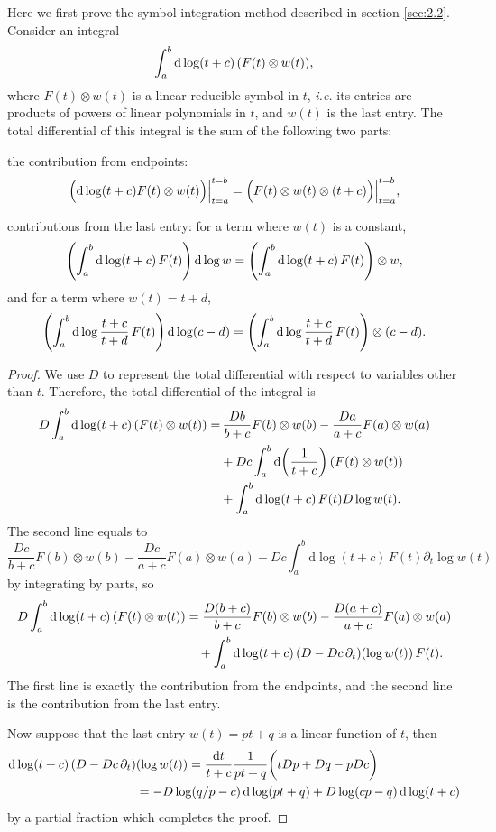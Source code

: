 \documentclass[a4paper,12pt]{article}
\newcommand{\dif}{\mathrm{d}} %
\begin{document}
Here we first prove the symbol integration method described in section \ref{sec:2.2}. Consider an integral
\[
\int_a^b {\rm d}\log(t+c)\, (F(t)\otimes w(t)),
\]
where $F(t)\otimes w(t)$ is a linear reducible symbol in $t$, {\it i.e.} its entries are products of powers of linear polynomials in $t$, and $w(t)$ is the last entry. The total differential of this integral is the sum of the following two parts:
\begin{compactenum}[\quad (1)]
\item the contribution from endpoints:
\[
   \Bigl( {\rm d}\log(t+c)F(t)\otimes w(t)\Bigr)\Bigr|_{t=a}^{t=b}=\Bigl(F(t)\otimes w(t)\otimes (t+c)\Bigr)\Bigr|_{t=a}^{t=b},
\]
\item contributions from the last entry: for a term where $w(t)$ is a constant,
\[
\left(\int_a^b {\rm d}\log(t+c)\, F(t)\right){\rm d}\log w=\left(\int_a^b {\rm d}\log(t+c)\, F(t)\right)\otimes w,
\]
and for a term where $w(t)=t+d$,
\[
\left(\int_a^b {\rm d}\log \frac{t+c}{t+d}\, F(t)\right){\rm d}\log (c-d)
=\left(\int_a^b {\rm d}\log \frac{t+c}{t+d}\, F(t)\right)\otimes (c-d).
\]
\end{compactenum}

\begin{proof}
We use $D$ to represent the total differential with respect to variables other than $t$. Therefore, the total differential of the integral is
\begin{align*}
D\int_a^b {\rm d}\log(t+c)\, (F(t)\otimes w(t))
=&\,\frac{Db}{b+c}F(b)\otimes w(b)-\frac{Da}{a+c}F(a)\otimes w(a)\\
&+Dc\int_a^b {\rm d}\biggl(\frac{1}{t+c}\biggr)\, (F(t)\otimes w(t))\\
&+\int_a^b {\rm d}\log(t+c)\, F(t) D\log w(t).
\end{align*}
The second line equals to 
\[
    \frac{Dc}{b+c}F(b)\otimes w(b)-\frac{Dc}{a+c}F(a)\otimes w(a)-Dc\int_a^b \dif\log(t+c)\, F(t) \partial_t \log w(t)
\]
by integrating by parts, so
\begin{align*}
    D\int_a^b {\rm d}\log(t+c)\, (F(t)\otimes w(t))&=\frac{D(b+c)}{b+c}F(b)\otimes w(b)-\frac{D(a+c)}{a+c}F(a)\otimes w(a)\\
    &\quad +\int_a^b {\rm d}\log(t+c)\, (D-Dc\,\partial_t)(\log w(t))\,F(t).
\end{align*}
The first line is exactly the contribution from the endpoints, and the second line is the contribution from the last entry.

Now suppose that the last entry $w(t)=pt+q$ is a linear function of $t$, then 
\begin{align*}
    {\rm d}\log(t+c)\, (D-Dc\,\partial_t)&(\log w(t))=\frac{\dif t}{t+c}\frac{1}{pt+q}\biggl(t Dp+Dq-p Dc\biggr)\\
    &=-D\log(q/p - c)\,\dif \log (pt+q)+D\log (cp-q)\, \dif \log (t+c)
\end{align*}
by a partial fraction which completes the proof.
\end{proof}
\end{document}
